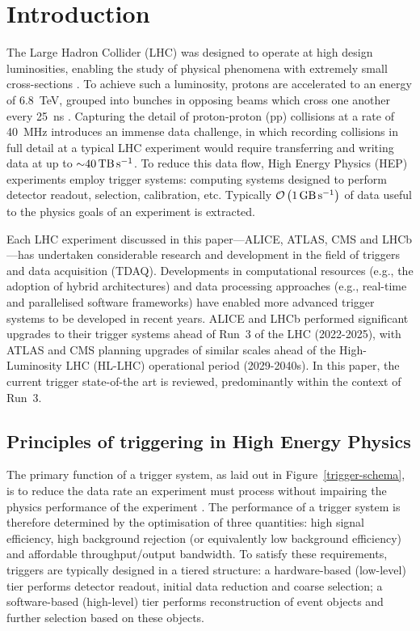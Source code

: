 \section{Introduction}

The Large Hadron Collider (LHC) was designed to operate at high design luminosities, enabling the study of physical phenomena with extremely small cross-sections \cite{CERN:lhc-design-report}. To achieve such a luminosity, protons are accelerated to an energy of \SI{6.8}{\tera\electronvolt}, grouped into bunches in opposing beams which cross one another every \SI{25}{\nano\second} \cite{CERN:lhc-run3-operation}. Capturing the detail of proton-proton (pp) collisions at a rate of \SI{40}{\mega\hertz} introduces an immense data challenge, in which recording collisions in full detail at a typical LHC experiment would require transferring and writing data at up to ${\sim}\SI{40}{\tera\byte\per\second}$. To reduce this data flow, High Energy Physics (HEP) experiments employ trigger systems: computing systems designed to perform detector readout, selection, calibration, etc. Typically $\mathcal{O}\left(\SI{1}{\giga\byte\per\second}\right)$ of data useful to the physics goals of an experiment is extracted.

Each LHC experiment discussed in this paper—ALICE, ATLAS, CMS and LHCb—has undertaken considerable research and development in the field of triggers and data acquisition (TDAQ). Developments in computational resources (e.g., the adoption of hybrid architectures) and data processing approaches (e.g., real-time and parallelised software frameworks) have enabled more advanced trigger systems to be developed in recent years. ALICE and LHCb performed significant upgrades to their trigger systems ahead of Run~3 of the LHC (2022-2025), with ATLAS and CMS planning upgrades of similar scales ahead of the High-Luminosity LHC (HL-LHC) operational period (2029-2040s). In this paper, the current trigger state-of-the art is reviewed, predominantly within the context of Run~3.

\subsection{Principles of triggering in High Energy Physics}

The primary function of a trigger system, as laid out in Figure~\ref{trigger-schema}, is to reduce the data rate an experiment must process without impairing the physics performance of the experiment \cite{Jeitler_2017, Smith2020, Beck_2007, ellis2010trigger}. The performance of a trigger system is therefore determined by the optimisation of three quantities: high signal efficiency, high background rejection (or equivalently low background efficiency) and affordable throughput/output bandwidth. To satisfy these requirements, triggers are typically designed in a tiered structure: a hardware-based (low-level) tier performs detector readout, initial data reduction and coarse selection; a software-based (high-level) tier performs reconstruction of event objects and further selection based on these objects.

